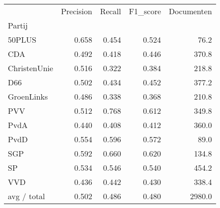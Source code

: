 \begin{tabular}{lrrrr}
\toprule
{} &  Precision &  Recall &  F1\_score &  Documenten \\
Partij       &            &         &           &             \\
\midrule
50PLUS       &      0.658 &   0.454 &     0.524 &        76.2 \\
   CDA       &      0.492 &   0.418 &     0.446 &       370.8 \\
ChristenUnie &      0.516 &   0.322 &     0.384 &       218.8 \\
   D66       &      0.502 &   0.434 &     0.452 &       377.2 \\
  GroenLinks &      0.486 &   0.338 &     0.368 &       210.8 \\
   PVV       &      0.512 &   0.768 &     0.612 &       349.8 \\
  PvdA       &      0.440 &   0.408 &     0.412 &       360.0 \\
  PvdD       &      0.554 &   0.596 &     0.572 &        89.0 \\
   SGP       &      0.592 &   0.660 &     0.620 &       134.8 \\
    SP       &      0.534 &   0.546 &     0.540 &       454.2 \\
   VVD       &      0.436 &   0.442 &     0.430 &       338.4 \\
 avg / total &      0.502 &   0.486 &     0.480 &      2980.0 \\
\bottomrule
\end{tabular}
